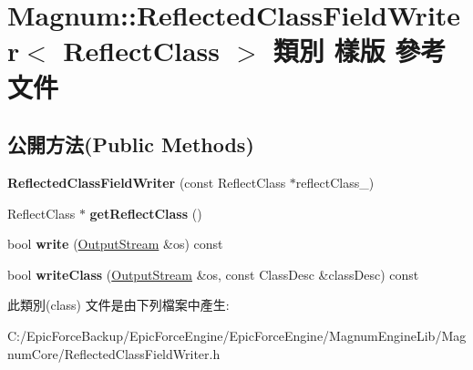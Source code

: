 \hypertarget{class_magnum_1_1_reflected_class_field_writer}{}\section{Magnum\+:\+:Reflected\+Class\+Field\+Writer$<$ Reflect\+Class $>$ 類別 樣版 參考文件}
\label{class_magnum_1_1_reflected_class_field_writer}
\subsection*{公開方法(Public Methods)}
\begin{DoxyCompactItemize}
\item 
{\bfseries Reflected\+Class\+Field\+Writer} (const Reflect\+Class $\ast$reflect\+Class\+\_\+)\hypertarget{class_magnum_1_1_reflected_class_field_writer_aea7e54d10877232e07e3aeed75c64921}{}\label{class_magnum_1_1_reflected_class_field_writer_aea7e54d10877232e07e3aeed75c64921}

\item 
Reflect\+Class $\ast$ {\bfseries get\+Reflect\+Class} ()\hypertarget{class_magnum_1_1_reflected_class_field_writer_a28fbbb0f8c1d6ff276d4fb5158fba4a1}{}\label{class_magnum_1_1_reflected_class_field_writer_a28fbbb0f8c1d6ff276d4fb5158fba4a1}

\item 
bool {\bfseries write} (\hyperlink{class_magnum_1_1_output_stream}{Output\+Stream} \&os) const \hypertarget{class_magnum_1_1_reflected_class_field_writer_aaea65b8f84b2e0f184924fba6877dac8}{}\label{class_magnum_1_1_reflected_class_field_writer_aaea65b8f84b2e0f184924fba6877dac8}

\item 
bool {\bfseries write\+Class} (\hyperlink{class_magnum_1_1_output_stream}{Output\+Stream} \&os, const Class\+Desc \&class\+Desc) const \hypertarget{class_magnum_1_1_reflected_class_field_writer_acc54452160c6df295f45e7e132a15953}{}\label{class_magnum_1_1_reflected_class_field_writer_acc54452160c6df295f45e7e132a15953}

\end{DoxyCompactItemize}


此類別(class) 文件是由下列檔案中產生\+:\begin{DoxyCompactItemize}
\item 
C\+:/\+Epic\+Force\+Backup/\+Epic\+Force\+Engine/\+Epic\+Force\+Engine/\+Magnum\+Engine\+Lib/\+Magnum\+Core/Reflected\+Class\+Field\+Writer.\+h\end{DoxyCompactItemize}
